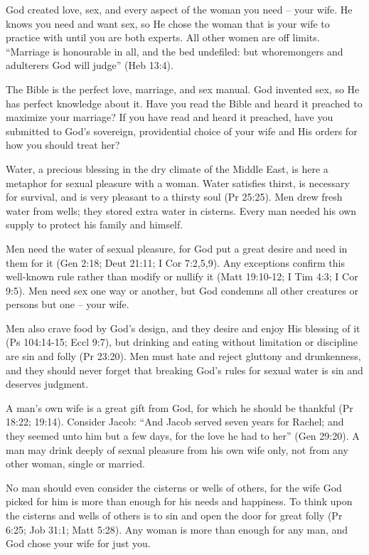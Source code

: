 God created love, sex, and every aspect of the woman you need – your wife. He knows you need and want sex, so He chose the woman that is your wife to practice with until you are both experts. All other women are off limits. “Marriage is honourable in all, and the bed undefiled: but whoremongers and adulterers God will judge” (Heb 13:4). 

The Bible is the perfect love, marriage, and sex manual. God invented sex, so He has perfect knowledge about it. Have you read the Bible and heard it preached to maximize your marriage? If you have read and heard it preached, have you submitted to God’s sovereign, providential choice of your wife and His orders for how you should treat her?

Water, a precious blessing in the dry climate of the Middle East, is here a metaphor for sexual pleasure with a woman. Water satisfies thirst, is necessary for survival, and is very pleasant to a thirsty soul (Pr 25:25). Men drew fresh water from wells; they stored extra water in cisterns. Every man needed his own supply to protect his family and himself.

Men need the water of sexual pleasure, for God put a great desire and need in them for it (Gen 2:18; Deut 21:11; I Cor 7:2,5,9). Any exceptions confirm this well-known rule rather than modify or nullify it (Matt 19:10-12; I Tim 4:3; I Cor 9:5). Men need sex one way or another, but God condemns all other creatures or persons but one – your wife. 

Men also crave food by God’s design, and they desire and enjoy His blessing of it (Ps 104:14-15; Eccl 9:7), but drinking and eating without limitation or discipline are sin and folly (Pr 23:20). Men must hate and reject gluttony and drunkenness, and they should never forget that breaking God’s rules for sexual water is sin and deserves judgment.

A man’s own wife is a great gift from God, for which he should be thankful (Pr 18:22; 19:14). Consider Jacob: “And Jacob served seven years for Rachel; and they seemed unto him but a few days, for the love he had to her” (Gen 29:20). A man may drink deeply of sexual pleasure from his own wife only, not from any other woman, single or married.

No man should even consider the cisterns or wells of others, for the wife God picked for him is more than enough for his needs and happiness. To think upon the cisterns and wells of others is to sin and open the door for great folly (Pr 6:25; Job 31:1; Matt 5:28). Any woman is more than enough for any man, and God chose your wife for just you.

